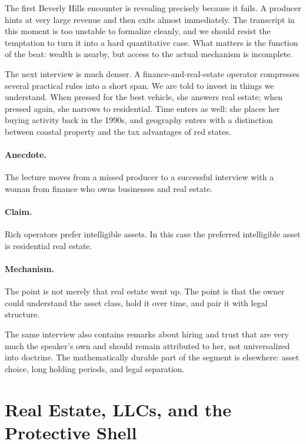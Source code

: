 The first Beverly Hills encounter is revealing precisely because it fails. A producer hints at very large revenue and then exits almost immediately. The transcript in this moment is too unstable to formalize cleanly, and we should resist the temptation to turn it into a hard quantitative case. What matters is the function of the beat: wealth is nearby, but access to the actual mechanism is incomplete.

The next interview is much denser. A finance-and-real-estate operator compresses several practical rules into a short span. We are told to invest in things we understand. When pressed for the best vehicle, she answers real estate; when pressed again, she narrows to residential. Time enters as well: she places her buying activity back in the 1990s, and geography enters with a distinction between coastal property and the tax advantages of red states.

\paragraph{Anecdote.} The lecture moves from a missed producer to a successful interview with a woman from finance who owns businesses and real estate.

\paragraph{Claim.} Rich operators prefer intelligible assets. In this case the preferred intelligible asset is residential real estate.

\paragraph{Mechanism.} The point is not merely that real estate went up. The point is that the owner could understand the asset class, hold it over time, and pair it with legal structure.

The same interview also contains remarks about hiring and trust that are very much the speaker's own and should remain attributed to her, not universalized into doctrine. The mathematically durable part of the segment is elsewhere: asset choice, long holding periods, and legal separation.

\section{Real Estate, LLCs, and the Protective Shell}

